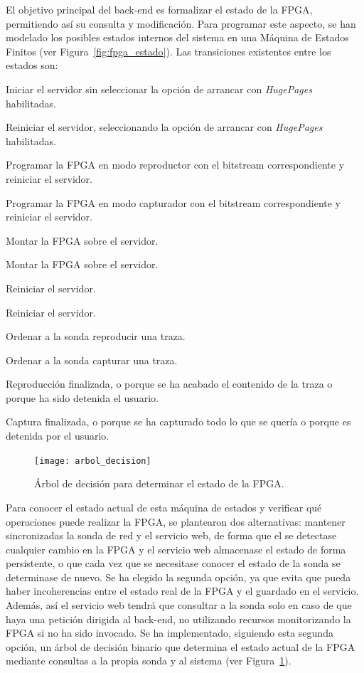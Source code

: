 El objetivo principal del \gls{back-end} es formalizar el estado de la \gls{FPGA}, permitiendo así su consulta y modificación.
Para programar este aspecto, se han modelado los posibles estados internos del sistema en una Máquina de Estados Finitos (ver Figura~\ref{fig:fpga_estado}).
Las transiciones existentes entre los estados son:
\begin{enumerate}[label={\bfseries [\arabic*]}]
  \item Iniciar el servidor sin seleccionar la opción de arrancar con \textit{HugePages} habilitadas.
  \item Reiniciar el servidor, seleccionando la opción de arrancar con \textit{HugePages} habilitadas.
  \item Programar la \gls{FPGA} en modo reproductor con el \gls{bitstream} correspondiente y reiniciar el servidor.
  \item Programar la \gls{FPGA} en modo capturador con el \gls{bitstream} correspondiente y reiniciar el servidor.
  \item Montar la \gls{FPGA} sobre el servidor.
  \item Montar la \gls{FPGA} sobre el servidor.
  \item Reiniciar el servidor.
  \item Reiniciar el servidor.
  \item Ordenar a la sonda reproducir una \gls{traza}.
  \item Ordenar a la sonda capturar una \gls{traza}.
  \item Reproducción finalizada, o porque se ha acabado el contenido de la \gls{traza} o porque ha sido detenida el usuario.
  \item Captura finalizada, o porque se ha capturado todo lo que se quería o porque es detenida por el usuario.
\end{enumerate}

\begin{figure}[!htp]
  \centering
  \texttt{[image: arbol\_decision]}
  \caption{Árbol de decisión para determinar el estado de la \gls{FPGA}.}
  \label{fig:arbol_decision}
\end{figure}

Para conocer el estado actual de esta máquina de estados y verificar qué operaciones puede realizar la \gls{FPGA}, se plantearon dos alternativas: mantener sincronizadas la sonda de red y el servicio web, de forma que el se detectase cualquier cambio en la \gls{FPGA} y el servicio web almacenase el estado de forma persistente, o que cada vez que se necesitase conocer el estado de la sonda se determinase de nuevo.
Se ha elegido la segunda opción, ya que evita que pueda haber incoherencias entre el estado real de la \gls{FPGA} y el guardado en el servicio.
Además, así el servicio web tendrá que consultar a la sonda solo en caso de que haya una petición dirigida al \gls{back-end}, no utilizando recursos monitorizando la \gls{FPGA} si no ha sido invocado.
Se ha implementado, siguiendo esta segunda opción, un árbol de decisión binario que determina el estado actual de la \gls{FPGA} mediante consultas a la propia sonda y al sistema (ver Figura~\ref{fig:arbol_decision}).

